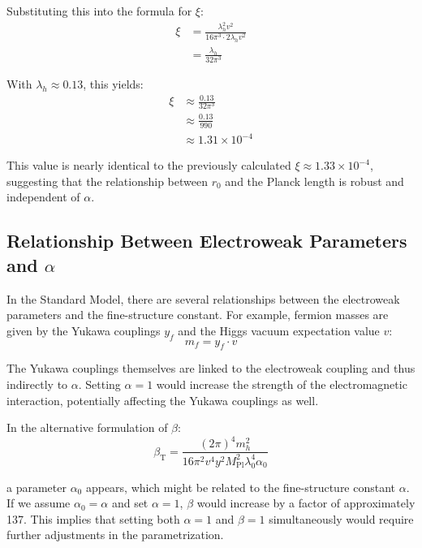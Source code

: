 \documentclass[12pt,a4paper]{article}
\newcommand{\betaT}{\beta_{\text{T}}}
\newcommand{\Mpl}{M_{\text{Pl}}}
\begin{document}
	Substituting this into the formula for \(\xi\):
	\begin{align}
		\xi &= \frac{\lambda_h^2 v^2}{16\pi^3 \cdot 2\lambda_h v^2} \\
		&= \frac{\lambda_h}{32\pi^3}
	\end{align}
	
	With \(\lambda_h \approx 0.13\), this yields:
	\begin{align}
		\xi &\approx \frac{0.13}{32\pi^3} \\
		&\approx \frac{0.13}{990} \\
		&\approx 1.31 \times 10^{-4}
	\end{align}
	
	This value is nearly identical to the previously calculated \(\xi \approx 1.33 \times 10^{-4}\), suggesting that the relationship between \(r_0\) and the Planck length is robust and independent of \(\alpha\).
	
	\subsection{Relationship Between Electroweak Parameters and \(\alpha\)}
	
	In the Standard Model, there are several relationships between the electroweak parameters and the fine-structure constant. For example, fermion masses are given by the Yukawa couplings \(y_f\) and the Higgs vacuum expectation value \(v\):
	\begin{equation}
		m_f = y_f \cdot v
	\end{equation}
	
	The Yukawa couplings themselves are linked to the electroweak coupling and thus indirectly to \(\alpha\). Setting \(\alpha = 1\) would increase the strength of the electromagnetic interaction, potentially affecting the Yukawa couplings as well.
	
	In the alternative formulation of \(\beta\):
	\begin{equation}
		\betaT = \frac{(2\pi)^4 m_h^2}{16 \pi^2 v^4 y^2 \Mpl^2 \lambda_0^4 \alpha_0}
	\end{equation}
	
	a parameter \(\alpha_0\) appears, which might be related to the fine-structure constant \(\alpha\). If we assume \(\alpha_0 = \alpha\) and set \(\alpha = 1\), \(\beta\) would increase by a factor of approximately 137. This implies that setting both \(\alpha = 1\) and \(\beta = 1\) simultaneously would require further adjustments in the parametrization.
	
\end{document}
